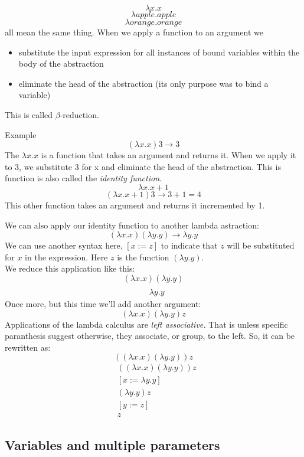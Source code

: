 \documentclass[a4paper]{article}
\begin{document}
\[\lambda x . x\]
\[\lambda apple . apple\]
\[\lambda orange . orange\]
all mean the same thing.
When we apply a function to an argument we 
\begin{itemize}
    \item substitute the input expression for all instances of bound variables within the body of the abstraction
    \item eliminate the head of the abstraction (its only purpose was to bind a variable)
\end{itemize}
This is called $\beta$-reduction. 
\begin{examplebox}{Example}
\[(\lambda x . x) 3 \rightarrow 3\]
The \(\lambda x . x\) is a function that takes an argument and returns it. When we apply it to 3, we substitute 3 for x and eliminate the head of the abstraction.
This is function is also called the \textit{identity function}.
\[\lambda x . x + 1\]
\[(\lambda x . x + 1) 3 \rightarrow 3 + 1 = 4\]
This other function takes an argument and returns it incremented by 1.
\end{examplebox}
We can also apply our identity function to another lambda astraction:
\[(\lambda x . x) (\lambda y . y) \rightarrow \lambda y . y\]
We can use another syntax here, $[x := z]$ to indicate that $z$ will  be substituted for $x$ in the expression.
Here $z$ is the function $(\lambda y . y)$.\\
We reduce this application like this:
\[(\lambda x . x)(\lambda y . y)\]
\begin{align*}
    [x := &\lambda y . y]\\
    &\lambda y . y
\end{align*}
Once more, but this time we'll add another argument:
\[(\lambda x . x)(\lambda y . y)z\]
Applications of the lambda calculus are \textit{left associative.} That is unless specific paranthesis suggest otherwise, they associate, or group, to the left. So, it can be rewritten as:
\[((\lambda x . x)(\lambda y . y))z\]
\begin{align*}
    &((\lambda x . x)(\lambda y . y))z\\
    &[x := \lambda y . y]\\
    &(\lambda y . y)z\\
    &[y := z]\\
    &z
\end{align*}    

\subsection{Variables and multiple parameters}
\end{document}
